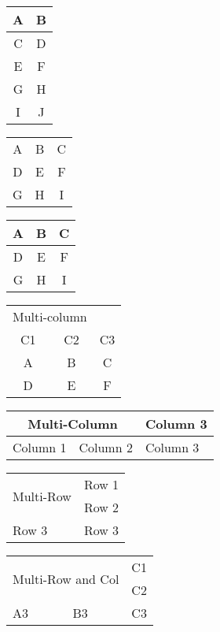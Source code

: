 \documentclass[
   article,       %
   12pt,          %
   oneside,       %
   a4paper,       %
   english,       %
   brazil,           %
   sumario=tradicional
   ]{abntex2}
\begin{document}
\begin{tabular}{cc}
    A & B \\
    \hline
    C & D \\
    E & F \\
    G & H \\
    I & J \\
\end{tabular}

\begin{tabular}{cc >{\columncolor{green!20}}c}
    A & B & C \\
    D & E & F \\
    G & H & I \\
\end{tabular}

\setlength{\arrayrulewidth}{1.5pt}
\begin{tabular}{|c|c|c|}
    \hline
    A & B & C \\
    \hline
    D & E & F \\
    \hline
    G & H & I \\
    \hline
\end{tabular}


\begin{tabular}{ccc}
    \toprule
    \multicolumn{2}{c}{Multi-column} & \\
    \cmidrule{1-2}
    C1 & C2 & C3 \\
    \midrule
    A & B & C \\
    D & E & F \\
    \bottomrule
\end{tabular}


\begin{tabular}{|l|l|l|}
    \hline
    \multicolumn{2}{|c|}{Multi-Column} & Column 3 \\
    \hline
    Column 1 & Column 2 & Column 3 \\
    \hline
\end{tabular}


\begin{tabular}{|l|l|}
    \hline
    \multirow{2}{*}{Multi-Row} & Row 1 \\
    \cline{2-2}
    & Row 2 \\
    \hline
    Row 3 & Row 3 \\
    \hline
\end{tabular}

\begin{tabular}{|l|l|l|}
    \hline
    \multicolumn{2}{|c|}{\multirow{2}{*}{Multi-Row and Col}} & C1 \\
    \cline{3-3}
    \multicolumn{2}{|c|}{} & C2 \\
    \hline
    A3 & B3 & C3 \\
    \hline
\end{tabular}
\end{document}
